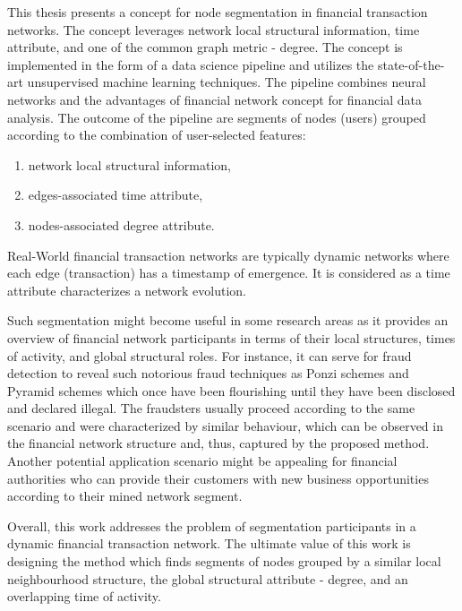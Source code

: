 This thesis presents a concept for node segmentation in financial transaction networks. The concept leverages network local structural information, time attribute, and one of the common graph metric - degree. The concept is implemented in the form of a data science pipeline and utilizes the state-of-the-art unsupervised machine learning techniques. The pipeline combines neural networks and the advantages of financial network concept for financial data analysis. The outcome of the pipeline are segments of nodes (users) grouped according to the combination of user-selected features:
\begin{enumerate}
  \item network local structural information,
  \item edges-associated time attribute,
  \item nodes-associated degree attribute. 
\end{enumerate}
Real-World financial transaction networks are typically dynamic networks where each edge (transaction) has a timestamp of emergence. It is considered as a time attribute characterizes a network evolution.

Such segmentation might become useful in some research areas as it provides an overview of financial network participants in terms of their local structures, times of activity, and global structural roles. For instance, it can serve for fraud detection to reveal such notorious fraud techniques as Ponzi schemes and Pyramid schemes which once have been flourishing until they have been disclosed and declared illegal. The fraudsters usually proceed according to the same scenario and were characterized by similar behaviour, which can be observed in the financial network structure and, thus, captured by the proposed method. Another potential application scenario might be appealing for financial authorities who can provide their customers with new business opportunities according to their mined network segment.

Overall, this work addresses the problem of segmentation participants in a dynamic financial transaction network. The ultimate value of this work is designing the method which finds segments of nodes grouped by a similar local neighbourhood structure, the global structural attribute - degree, and an overlapping time of activity.


